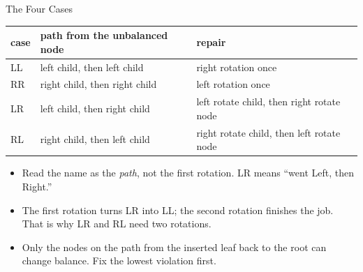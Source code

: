 \documentclass[aspectratio=169]{beamer}
\begin{document}
\begin{frame}{The Four Cases}
  \begin{center}
  {\footnotesize
  \begin{tabular}{l l l}
    \toprule
    \textbf{case} & \textbf{path from the unbalanced node} & \textbf{repair} \\
    \midrule
    LL & left child, then left child  & right rotation once \\
    RR & right child, then right child & left rotation once \\
    LR & left child, then right child & left rotate child, then right rotate node \\
    RL & right child, then left child & right rotate child, then left rotate node \\
    \bottomrule
  \end{tabular}}
  \end{center}
  \begin{itemize}
    \item Read the name as the \emph{path}, not the first rotation. LR means
      ``went Left, then Right.''
    \item The first rotation turns LR into LL; the second rotation finishes
      the job. That is why LR and RL need two rotations.
    \item Only the nodes on the path from the inserted leaf back to the root
      can change balance. Fix the lowest violation first.
  \end{itemize}
\end{frame}
\end{document}
